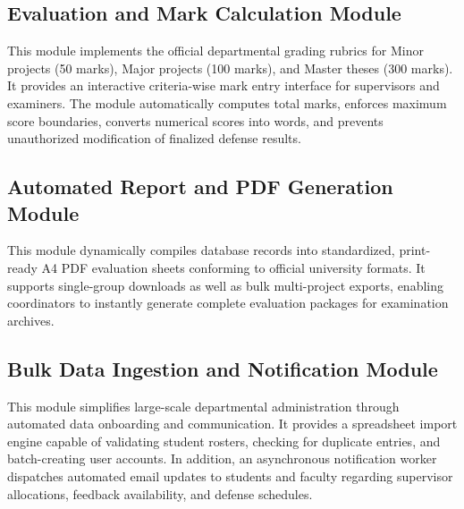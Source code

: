 \subsection{Evaluation and Mark Calculation Module}
This module implements the official departmental grading rubrics for Minor projects (50 marks), Major projects (100 marks), and Master theses (300 marks). It provides an interactive criteria-wise mark entry interface for supervisors and examiners. The module automatically computes total marks, enforces maximum score boundaries, converts numerical scores into words, and prevents unauthorized modification of finalized defense results.

\subsection{Automated Report and PDF Generation Module}
This module dynamically compiles database records into standardized, print-ready A4 PDF evaluation sheets conforming to official university formats. It supports single-group downloads as well as bulk multi-project exports, enabling coordinators to instantly generate complete evaluation packages for examination archives.

\subsection{Bulk Data Ingestion and Notification Module}
This module simplifies large-scale departmental administration through automated data onboarding and communication. It provides a spreadsheet import engine capable of validating student rosters, checking for duplicate entries, and batch-creating user accounts. In addition, an asynchronous notification worker dispatches automated email updates to students and faculty regarding supervisor allocations, feedback availability, and defense schedules.

